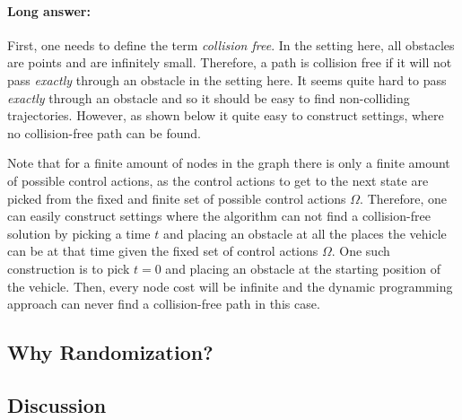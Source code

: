 \paragraph{Long answer:} First, one needs to define the term \emph{collision free}.
In the setting here, all obstacles are points and are infinitely small.
Therefore, a path is collision free if it will not pass \emph{exactly} through an obstacle in the setting here.
It seems quite hard to pass \emph{exactly} through an obstacle and so it should be easy to find non-colliding trajectories.
However, as shown below it quite easy to construct settings, where no collision-free path can be found.

Note that for a finite amount of nodes in the graph there is only a finite amount of possible control actions, as the control actions to get to the next state are picked from the fixed and finite set of possible control actions $\Omega$.
Therefore, one can easily construct settings where the algorithm can not find a collision-free solution by picking a time $t$ and placing an obstacle at all the places the vehicle can be at that time given the fixed set of control actions $\Omega$.
One such construction is to pick $t=0$ and placing an obstacle at the starting position of the vehicle.
Then, every node cost will be infinite and the dynamic programming approach can never find a collision-free path in this case.

\subsection{Why Randomization?}

\subsection{Discussion}

